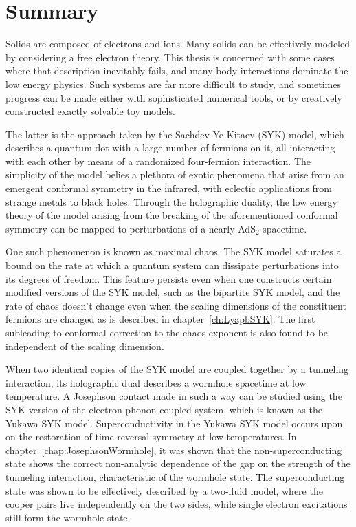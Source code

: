 \newpage
\thispagestyle{empty}

\chapter*{Summary}
\label{Summary}

Solids are composed of electrons and ions. Many solids can be effectively modeled by considering a free electron theory. This thesis is concerned with some cases where that description inevitably fails, and many body interactions dominate the low energy physics. Such systems are far more difficult to study, and sometimes progress can be made either with sophisticated numerical tools, or by creatively constructed exactly solvable toy models.
\par
The latter is the approach taken by the Sachdev-Ye-Kitaev (SYK) model, which describes a quantum dot with a large number of fermions on it, all interacting with each other by means of a randomized four-fermion interaction. The simplicity of the model belies a plethora of exotic phenomena that arise from an emergent conformal symmetry in the infrared, with eclectic applications from strange metals to black holes. Through the holographic duality, the low energy theory of the model arising from the breaking of the aforementioned conformal symmetry can be mapped to perturbations of a nearly AdS${}_2$ spacetime. 
\par
One such phenomenon is known as maximal chaos. The SYK model saturates a bound on the rate at which a quantum system can dissipate perturbations into its degrees of freedom. This feature persists even when one constructs certain modified versions of the SYK model, such as the bipartite SYK model, and the rate of chaos doesn't change even when the scaling dimensions of the constituent fermions are changed as is described in chapter~\ref{ch:LyapbSYK}. The first subleading to conformal correction to the chaos exponent is also found to be independent of the scaling dimension. 
\par
When two identical copies of the SYK model are coupled together by a tunneling interaction, its holographic dual describes a wormhole spacetime at low temperature. A Josephson contact made in such a way can be studied using the SYK version of the electron-phonon coupled system, which is known as the Yukawa SYK model. Superconductivity in the Yukawa SYK model occurs upon on the restoration of time reversal symmetry at low temperatures. In chapter~\ref{chap:JosephsonWormhole}, it was shown that the non-superconducting state shows the correct non-analytic dependence of the gap on the strength of the tunneling interaction, characteristic of the wormhole state. The superconducting state was shown to be effectively described by a two-fluid model, where the cooper pairs live independently on the two sides, while single electron excitations still form the wormhole state. 
